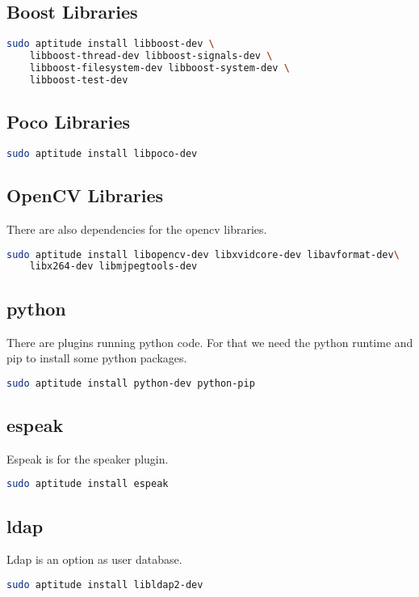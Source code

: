 \documentclass[german,a4paper,11pt]{report}
\begin{document}
\subsection{Boost Libraries}
\begin{lstlisting}[language=bash,caption={install boost}]
sudo aptitude install libboost-dev \
	libboost-thread-dev libboost-signals-dev \
	libboost-filesystem-dev libboost-system-dev \
	libboost-test-dev
\end{lstlisting}

\subsection{Poco Libraries}
\begin{lstlisting}[language=bash,caption={install poco}]
sudo aptitude install libpoco-dev
\end{lstlisting}

\subsection{OpenCV Libraries}
There are also dependencies for the opencv libraries.
\begin{lstlisting}[language=bash,caption={install opencv}]
sudo aptitude install libopencv-dev libxvidcore-dev libavformat-dev\
	libx264-dev libmjpegtools-dev
\end{lstlisting}

\subsection{python}
There are plugins running python code.
For that we need the python runtime and pip to install some python packages.
\begin{lstlisting}[language=bash,caption={install python, python-pip}]
sudo aptitude install python-dev python-pip
\end{lstlisting}

\subsection{espeak}
Espeak is for the speaker plugin.
\begin{lstlisting}[language=bash,caption={install libespeak}]
sudo aptitude install espeak
\end{lstlisting}

\subsection{ldap}
Ldap is an option as user database.
\begin{lstlisting}[language=bash,caption={install libldap}]
sudo aptitude install libldap2-dev
\end{lstlisting}
\end{document}
